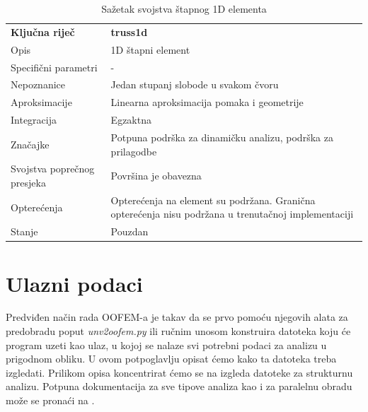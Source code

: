 \documentclass[a4paper,twoside,12pt]{memoir} %
\begin{document}
\begin{table}[h!]
\centering
\begin{tabular}{| m{9em} | m{25em}|} 
 \hline
 \textbf{Ključna riječ} & \textbf{truss1d} \\ [1ex]
 Opis & 1D štapni element \\
 Specifični parametri & - \\
 \hline
 Nepoznanice & Jedan stupanj slobode u svakom čvoru \\ 
 Aproksimacije & Linearna aproksimacija pomaka i geometrije \\
 Integracija & Egzaktna \\
 Značajke & Potpuna podrška za dinamičku analizu, podrška za prilagodbe \\
 Svojstva poprečnog presjeka & Površina je obavezna \\
 Opterećenja & Opterećenja na element su podržana. Granična opterećenja nisu podržana u trenutačnoj implementaciji\\
 Stanje & Pouzdan \\
 \hline
\end{tabular}
\caption{Sažetak svojstva štapnog 1D elementa}
\label{tab:svojstva_stapnog_elementa}
\end{table}


\section{Ulazni podaci}
\label{poglavlje:koristenje_oofema}
Predviđen način rada OOFEM-a je takav da se prvo pomoću njegovih alata za predobradu poput \textit{unv2oofem.py} ili ručnim unosom konstruira datoteka koju će program uzeti kao ulaz, u kojoj se nalaze svi potrebni podaci za analizu u prigodnom obliku. U ovom potpoglavlju opisat ćemo kako ta datoteka treba izgledati. Prilikom opisa koncentrirat ćemo se na izgleda datoteke za strukturnu analizu. Potpuna dokumentacija za sve tipove analiza kao i za paralelnu obradu može se pronaći na \cite{oofem-web}. \par
\end{document}
